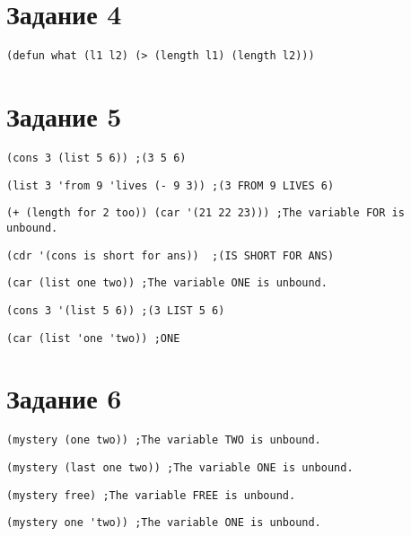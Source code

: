 \section{Задание 4}
\begin{center}
	\begin{lstlisting}[label=a4, caption={Выражение 1}]
 (defun what (l1 l2) (> (length l1) (length l2)))
	\end{lstlisting}
\end{center}

\section{Задание 5}
\begin{center}
	\begin{lstlisting}[label=a5, caption={Выражение 1}]
(cons 3 (list 5 6)) ;(3 5 6)
	\end{lstlisting}
	\begin{lstlisting}[label=b5, caption={Выражение 2}]
(list 3 'from 9 'lives (- 9 3)) ;(3 FROM 9 LIVES 6)
	\end{lstlisting}
	\begin{lstlisting}[label=c5, caption={Выражение 3}]
(+ (length for 2 too)) (car '(21 22 23))) ;The variable FOR is unbound.
	\end{lstlisting}
	\begin{lstlisting}[label=d5, caption={Выражение 4}]
(cdr '(cons is short for ans))  ;(IS SHORT FOR ANS)
	\end{lstlisting}
	\begin{lstlisting}[label=e5, caption={Выражение 5}]
(car (list one two)) ;The variable ONE is unbound.
	\end{lstlisting}
	\begin{lstlisting}[label=f5, caption={Выражение 6}]
(cons 3 '(list 5 6)) ;(3 LIST 5 6)
	\end{lstlisting}
	\begin{lstlisting}[label=g5, caption={Выражение 7}]
(car (list 'one 'two)) ;ONE
	\end{lstlisting}
\end{center}
\section{Задание 6}
\begin{center}
	\begin{lstlisting}[label=a6, caption={Выражение 1}]
	(mystery (one two)) ;The variable TWO is unbound.
	\end{lstlisting}
	\begin{lstlisting}[label=b6, caption={Выражение 2}]
	(mystery (last one two)) ;The variable ONE is unbound.
	\end{lstlisting}
	\begin{lstlisting}[label=c6, caption={Выражение 3}]
	(mystery free) ;The variable FREE is unbound.
	\end{lstlisting}
	\begin{lstlisting}[label=d6, caption={Выражение 4}]
	(mystery one 'two)) ;The variable ONE is unbound.
	\end{lstlisting}
\end{center}
